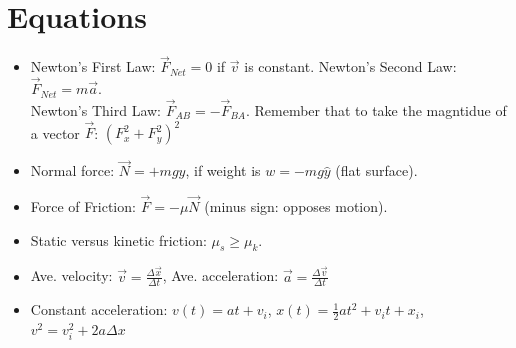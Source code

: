 \documentclass[10pt]{article}
\begin{document}
\maketitle

\section{Equations}
\begin{itemize}
\item Newton's First Law: $\vec{F}_{Net} = 0$ if $\vec{v}$ is constant.  Newton's Second Law: $\vec{F}_{Net} = m \vec{a}$. \\ Newton's Third Law: $\vec{F}_{AB} = -\vec{F}_{BA}$.  Remember that to take the magntidue of a vector $\vec{F}$: $(F_x^2 + F_y^2)^2$
\item Normal force: $\vec{N} = +mg\hat{y}$, if weight is $w = -mg\hat{y}$ (flat surface).
\item Force of Friction: $\vec{F} = -\mu \vec{N}$ (minus sign: opposes motion).
\item Static versus kinetic friction: $\mu_s \geq \mu_k$.
\item Ave. velocity: $\vec{v} = \frac{\Delta \vec{x}}{\Delta t}$, Ave. acceleration: $\vec{a} = \frac{\Delta \vec{v}}{\Delta t}$
\item Constant acceleration: $v(t) = at + v_i$, $x(t) = \frac{1}{2} a t^2 + v_i t + x_i$, $v^2 = v_i^2 + 2 a \Delta x$
\end{itemize}
\end{document}
